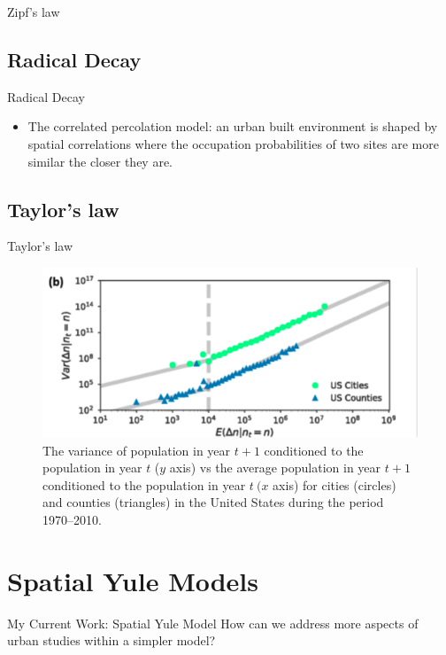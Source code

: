 \documentclass{beamer}
\begin{document}
\begin{frame}{Zipf's law}
\subsection{Radical Decay}
\begin{frame}{Radical Decay}
  \begin{itemize}
    \item The correlated percolation model: an urban built environment is shaped by spatial correlations where the occupation probabilities of two sites are more similar the closer they are.
  \end{itemize}
\end{frame}

\subsection{Taylor's law}

  \begin{frame}{Taylor's law}
    \begin{figure}
      \centering
      \includegraphics[width = 0.5\linewidth]{pics/taylor's.png}
      \caption{The variance of population in year $t+1$ conditioned to the population in year $t$ ($y$ axis) vs the average population in year $t+1$ conditioned to the population in year $t\ (x$
       axis) for cities (circles) and counties (triangles) in the United States during the period 1970–2010.}
    \end{figure}
  \end{frame}


\section{Spatial Yule Models}

\begin{frame}{My Current Work: Spatial Yule Model}
  How can we address more aspects of urban studies within a simpler model?
\end{frame}


\end{frame}
\end{document}
